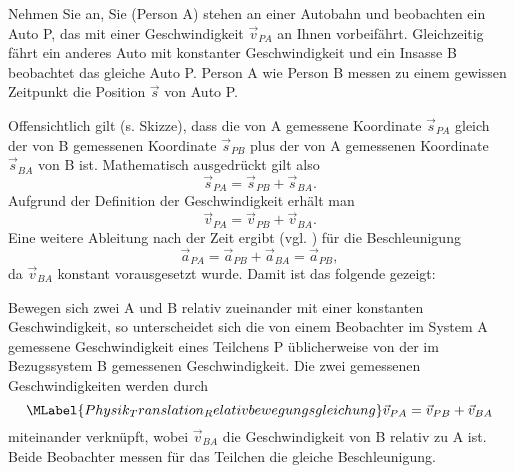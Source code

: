      \begin{MContent}
          Nehmen Sie an, Sie (Person A) stehen an einer Autobahn und beobachten ein Auto P, das mit einer Geschwindigkeit $\vec{v}_{PA}$ an Ihnen vorbeif\"ahrt. Gleichzeitig f\"ahrt ein anderes Auto mit konstanter Geschwindigkeit und ein Insasse B beobachtet das gleiche Auto P. Person A wie Person B messen zu einem gewissen Zeitpunkt die Position $\vec{s}$ von Auto P.
          
          
           Offensichtlich gilt (s. Skizze), dass die von A gemessene Koordinate $\vec{s}_{PA}$ gleich der von B gemessenen Koordinate $\vec{s}_{PB}$ plus der von A gemessenen Koordinate $\vec{s}_{BA}$ von B ist. Mathematisch ausgedr\"uckt gilt also
          $$
         \vec{s}_{PA}=\vec{s}_{PB}+\vec{s}_{BA}.
          $$Aufgrund der Definition der Geschwindigkeit  erh\"alt man
          $$
          \vec{v}_{PA}=\vec{v}_{PB}+\vec{v}_{BA}.
          $$ Eine weitere Ableitung nach der Zeit ergibt (vgl. ) f\"ur die Beschleunigung
     $$
     \vec{a}_{PA}=\vec{a}_{PB}+\vec{a}_{BA}= \vec{a}_{PB},
      $$
      da $\vec{v}_{BA}$ konstant vorausgesetzt wurde. Damit ist das folgende gezeigt:
      
      
      \begin{MInfo}
      Bewegen sich zwei  A und B relativ zueinander mit einer konstanten Geschwindigkeit, so unterscheidet sich die von einem Beobachter im System A gemessene Geschwindigkeit eines Teilchens P \"ublicherweise von der im Bezugssystem B gemessenen Geschwindigkeit. Die zwei gemessenen Geschwindigkeiten werden durch 
      \begin{equation}
      \MLabel{Physik_Translation_Relativbewegungsgleichung}
      \vec{v}_{PA}=\vec{v}_{PB}+\vec{v}_{BA}
      \end{equation}miteinander verkn\"upft, wobei $\vec{v}_{BA}$ die Geschwindigkeit von B relativ zu A ist. Beide Beobachter messen f\"ur das Teilchen die gleiche Beschleunigung. 
      \end{MInfo}
      
      \end{MContent}

